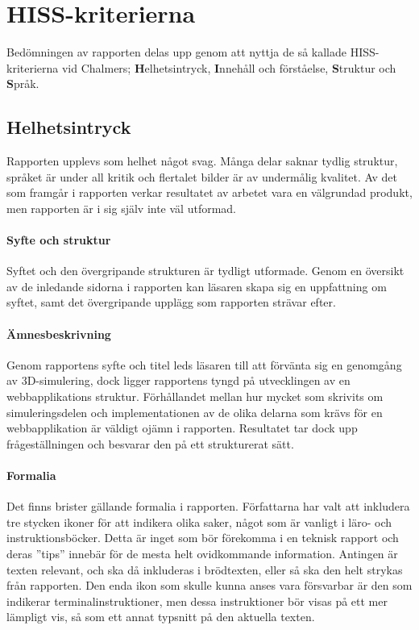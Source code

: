 \section{HISS-kriterierna} %
\label{sec:hiss}
    Bedömningen av rapporten delas upp genom att nyttja de så kallade HISS-kriterierna vid Chalmers; \textbf{H}elhetsintryck, \textbf{I}nnehåll och förståelse, \textbf{S}truktur och \textbf{S}pråk.

    \subsection{Helhetsintryck} %
    \label{sub:helhetsintryck}
        Rapporten upplevs som helhet något svag. Många delar saknar tydlig struktur, språket är under all kritik och flertalet bilder är av undermålig kvalitet. Av det som framgår i rapporten verkar resultatet av arbetet vara en välgrundad produkt, men rapporten är i sig själv inte väl utformad.

        \paragraph{Syfte och struktur}
            Syftet och den övergripande strukturen är tydligt utformade. Genom en översikt av de inledande sidorna i rapporten kan läsaren skapa sig en uppfattning om syftet, samt det övergripande upplägg som rapporten strävar efter.

        \paragraph{Ämnesbeskrivning}
            Genom rapportens syfte och titel leds läsaren till att förvänta sig en genomgång av 3D-simulering, dock ligger rapportens tyngd på utvecklingen av en webbapplikations struktur. Förhållandet mellan hur mycket som skrivits om simuleringsdelen och implementationen av de olika delarna som krävs för en webb\-applikation är väldigt ojämn i rapporten. Resultatet tar dock upp frågeställningen och besvarar den på ett strukturerat sätt.

        \paragraph{Formalia}
            Det finns brister gällande formalia i rapporten. Författarna har valt att inkludera tre stycken ikoner för att indikera olika saker, något som är vanligt i läro- och instruktionsböcker. Detta är inget som bör förekomma i en teknisk rapport och deras ''tips'' innebär för de mesta helt ovidkommande information. Antingen är texten relevant, och ska då inkluderas i brödtexten, eller så ska den helt strykas från rapporten. Den enda ikon som skulle kunna anses vara försvarbar är den som indikerar terminalinstruktioner, men dessa instruktioner bör visas på ett mer lämpligt vis, så som ett annat typsnitt på den aktuella texten.

